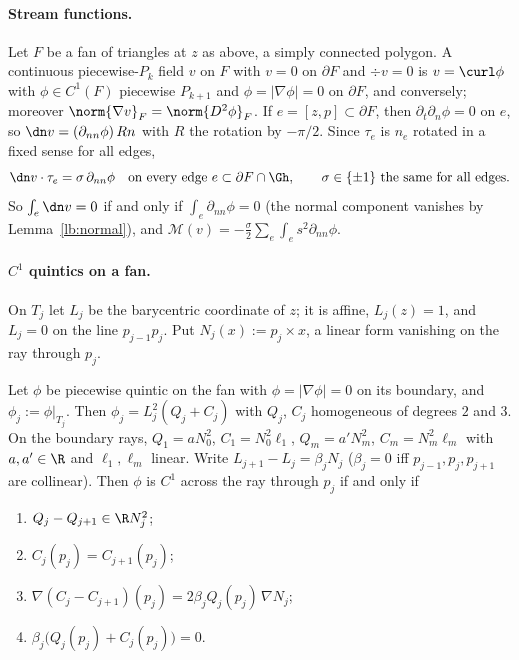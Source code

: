\paragraph{Stream functions.}
Let $F$ be a fan of triangles at $z$ as above, a simply connected polygon. A continuous piecewise-$P_k$ field $v$ on $F$ with $v=0$ on $\partial F$ and $\div v=0$ is $v=\curl\phi$ with $\phi\in C^1(F)$ piecewise $P_{k+1}$ and $\phi=|\nabla\phi|=0$ on $\partial F$, and conversely; moreover $\norm{\nabla v}_F=\norm{D^2\phi}_F$. If $e=[z,p]\subset\partial F$, then $\partial_t\partial_n\phi=0$ on $e$, so $\dn v=(\partial_{nn}\phi)\,R n$ with $R$ the rotation by $-\pi/2$. Since $\tau_e$ is $n_e$ rotated in a fixed sense for all edges,
\begin{equation}\label{m3:dnv}
\dn v\cdot\tau_e=\sigma\,\partial_{nn}\phi\quad\text{on every edge }e\subset\partial F\cap\Gh,\qquad\sigma\in\{\pm1\}\text{ the same for all edges}.
\end{equation}
So $\int_e\dn v=0$ if and only if $\int_e\partial_{nn}\phi=0$ (the normal component vanishes by Lemma~\ref{lb:normal}), and $\mathcal M(v)=-\tfrac\sigma2\sum_e\int_e s^2\partial_{nn}\phi$.

\paragraph{$C^1$ quintics on a fan.}
On $T_j$ let $L_j$ be the barycentric coordinate of $z$; it is affine, $L_j(z)=1$, and $L_j=0$ on the line $p_{j-1}p_j$. Put $N_j(x):=p_j\times x$, a linear form vanishing on the ray through $p_j$.

\begin{lemma}[Gluing]\label{m3:glue}
Let $\phi$ be piecewise quintic on the fan with $\phi=|\nabla\phi|=0$ on its boundary, and $\phi_j:=\phi|_{T_j}$. Then $\phi_j=L_j^2(Q_j+C_j)$ with $Q_j$, $C_j$ homogeneous of degrees $2$ and $3$. On the boundary rays, $Q_1=aN_0^2$, $C_1=N_0^2\ell_1$, $Q_m=a'N_m^2$, $C_m=N_m^2\ell_m$ with $a,a'\in\R$ and $\ell_1,\ell_m$ linear. Write $L_{j+1}-L_j=\beta_jN_j$ ($\beta_j=0$ iff $p_{j-1},p_j,p_{j+1}$ are collinear). Then $\phi$ is $C^1$ across the ray through $p_j$ if and only if
\begin{enumerate}[label=(G\arabic*)]
\item $Q_j-Q_{j+1}\in\R N_j^2$;
\item $C_j(p_j)=C_{j+1}(p_j)$;
\item $\nabla(C_j-C_{j+1})(p_j)=2\beta_jQ_j(p_j)\,\nabla N_j$;
\item $\beta_j\bigl(Q_j(p_j)+C_j(p_j)\bigr)=0$.
\end{enumerate}
\end{lemma}

